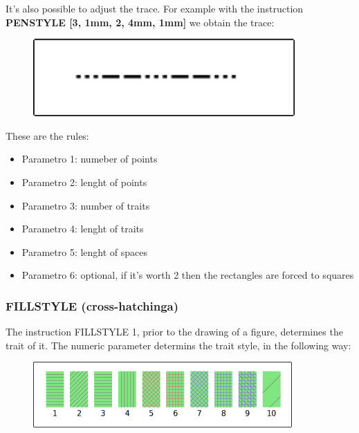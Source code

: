 \vskip 1cm

It's also possible to adjust the trace. For example with the instruction \textbf{PENSTYLE [3, 1mm, 2, 4mm, 1mm]} we obtain the trace:

\vskip 1cm

\begin{figure}[H]
   \centering
   \includegraphics[width=10.0cm,trim=8 8 8 8,clip]{./images/disegnare/disegnare-39.png}
   \label{dis-40}
\end{figure}

\vskip 1cm

These are the rules: 

\begin{itemize}
\item Parametro 1: numeber of points
\item Parametro 2: lenght of points
\item Parametro 3: number of traits
\item Parametro 4: lenght of traits
\item Parametro 5: lenght of spaces
\item Parametro 6: optional, if it's worth 2 then the rectangles are forced to squares 
\end{itemize}

\subsubsection{FILLSTYLE (cross-hatchinga)}

The instruction FILLSTYLE 1, prior to the drawing of a figure, determines the trait of it. The numeric parameter determins the trait style, in the following way: 


\vskip 1cm

\begin{figure}[H]
   \centering
   \includegraphics[width=10.0cm,trim=8 8 8 8,clip]{./images/disegnare/disegnare-40.png}
   \label{dis-41}
\end{figure}

